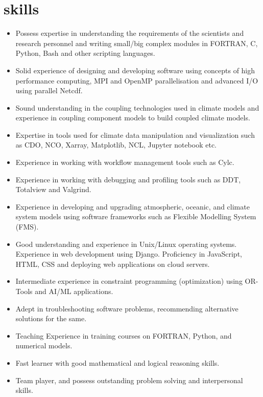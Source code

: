 \documentclass[]{cv-style}          %
\begin{document}
\section{skills}
    \begin{itemize}
        \item Possess expertise in understanding the requirements of the scientists and research personnel and writing small/big complex modules in FORTRAN, C, Python, Bash and other scripting languages.
        \item Solid experience of designing and developing software using concepts of high performance computing, MPI and OpenMP parallelisation and advanced I/O using parallel Netcdf.
        \item Sound understanding in the coupling technologies used in climate models and experience in coupling component models to build coupled climate models.
        \item Expertise in tools used for climate data manipulation and visualization such as CDO, NCO, Xarray, Matplotlib, NCL, Jupyter notebook etc.
        \item Experience in working with workflow management tools such as Cylc.
        \item Experience in working with debugging and profiling tools such as DDT, Totalview and Valgrind.
        \item Experience in developing and upgrading atmospheric, oceanic, and climate system models using software frameworks such as Flexible Modelling System (FMS).
        \item Good understanding and experience in Unix/Linux operating systems.
        Experience in web development using Django. Proficiency in JavaScript, HTML, CSS and deploying web applications on cloud servers.
        \item Intermediate experience in constraint programming (optimization) using OR-Tools and AI/ML applications.
        \item Adept in troubleshooting software problems, recommending alternative solutions for the same.
        \item Teaching Experience in training courses on FORTRAN, Python, and numerical models.
        \item Fast learner with good mathematical and logical reasoning skills.
        \item Team player, and possess outstanding problem solving and interpersonal skills.
    \end{itemize}
\end{document}
